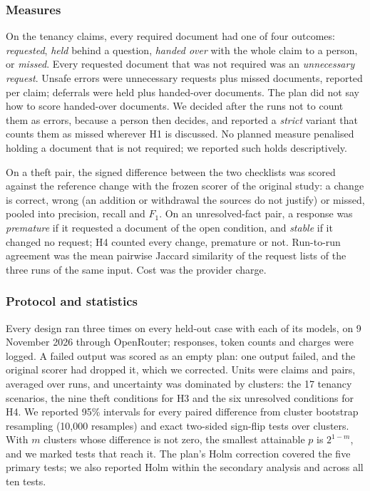 \subsubsection{Measures}
\label{sec:measures}

On the tenancy claims, every required document had one of four outcomes: \emph{requested}, \emph{held} behind a question, \emph{handed over} with the whole claim to a person, or \emph{missed}. Every requested document that was not required was an \emph{unnecessary request}. Unsafe errors were unnecessary requests plus missed documents, reported per claim; deferrals were held plus handed-over documents. The plan did not say how to score handed-over documents. We decided after the runs not to count them as errors, because a person then decides, and reported a \emph{strict} variant that counts them as missed wherever H1 is discussed. No planned measure penalised holding a document that is not required; we reported such holds descriptively.

On a theft pair, the signed difference between the two checklists was scored against the reference change with the frozen scorer of the original study: a change is correct, wrong (an addition or withdrawal the sources do not justify) or missed, pooled into precision, recall and $F_1$. On an unresolved-fact pair, a response was \emph{premature} if it requested a document of the open condition, and \emph{stable} if it changed no request; H4 counted every change, premature or not. Run-to-run agreement was the mean pairwise Jaccard similarity of the request lists of the three runs of the same input. Cost was the provider charge.

\subsubsection{Protocol and statistics}
\label{sec:protocol}

Every design ran three times on every held-out case with each of its models, on 9 November 2026 through OpenRouter; responses, token counts and charges were logged. A failed output was scored as an empty plan: one  output failed, and the original scorer had dropped it, which we corrected. Units were claims and pairs, averaged over runs, and uncertainty was dominated by clusters: the 17 tenancy scenarios, the nine theft conditions for H3 and the six unresolved conditions for H4. We reported 95\% intervals for every paired difference from cluster bootstrap resampling (10,000 resamples) and exact two-sided sign-flip tests over clusters. With $m$ clusters whose difference is not zero, the smallest attainable $p$ is $2^{1-m}$, and we marked tests that reach it. The plan's Holm correction covered the five primary tests; we also reported Holm within the secondary analysis and across all ten tests.

